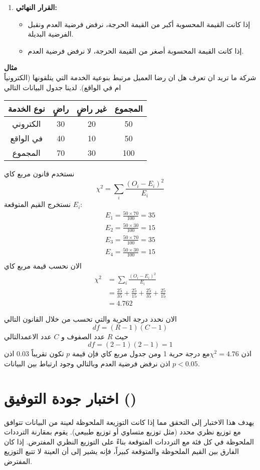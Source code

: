 \begin{enumerate}
	\item \textbf{القرار النهائي:}
	\begin{itemize}
		\item إذا كانت القيمة المحسوبة أكبر من القيمة الحرجة، نرفض فرضية العدم ونقبل الفرضية البديلة.
		\item إذا كانت القيمة المحسوبة أصغر من القيمة الحرجة، لا نرفض فرضية العدم.
	\end{itemize}
\end{enumerate}


\noindent
\textbf{مثال}\\
شركة ما تريد ان تعرف هل ان رضا العميل مرتبط بنوعية الخدمة التي يتلقونها (الكترونياً ام في الواقع). لدينا جدول البيانات التالي

\begin{table}[H]
    \centering
	\begin{tabular}{| c| c| c| c|}
		\hline
		نوع الخدمة & راضٍ & غير راضٍ & المجموع \\
		\hline 
		الكتروني & 30 & 20 & 50 \\
		\hline
		في الواقع & 40 & 10 & 50 \\
		\hline
		المجموع & 70 & 30 &100\\
		\hline
	\end{tabular}
\end{table}
نستخدم قانون مربع كاي
\[
\chi^2 = \sum_i \frac{(O_i - E_i)^2}{E_i} 
\]
نستخرج القيم المتوقعة $E_i$:
\begin{align*}
	E_1 = \frac{50\times 70}{100} = 35\\
	E_2 = \frac{50\times30}{100} = 15\\
	E_3 = \frac{50\times70}{100} = 35\\
	E_4 = \frac{50\times30}{100} = 15\\
\end{align*}
الان نحسب قيمة مربع كاي
\begin{align*}
	\chi^2 &= \sum_i \frac{(O_i - E_i)^2}{E_i} \\
	&= \frac{25}{35} + \frac{25}{15} + \frac{25}{35} + \frac{25}{15}\\
	&= 4.762
\end{align*}

الان نحدد درجة الحرية والتي تحسب من خلال القانون التالي
\[
df = (R-1)(C-1)
\]
حيث $R$ عدد الصفوف و $C$ عدد الاعمدالتالي
\[
df = (2-1)(2-1) = 1
\]
اذن $\chi^2 = 4.76$مع درجة حرية 1 ومن جدول مربع كاي فإن قيمة $p$ تكون تقريباً $0.03$ اذن $p < 0.05$ اذن نرفض فرضية العدم وبالتالي وجود ارتباط بين البيانات.
\section{اختبار جودة التوفيق ()}
يهدف هذا الاختبار إلى التحقق مما إذا كانت التوزيعة الملحوظة لعينة من البيانات تتوافق مع توزيع نظري محدد (مثل توزيع متساوي أو توزيع طبيعي). يقوم بمقارنة الترددات الملحوظة في كل فئة مع الترددات المتوقعة بناءً على التوزيع النظري المفترض. إذا كان الفارق بين القيم الملحوظة والمتوقعة كبيراً، فإنه يشير إلى أن العينة لا تتبع التوزيع المفترض.

